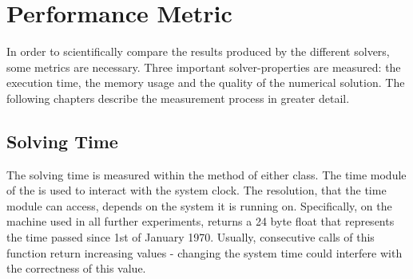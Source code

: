 \documentclass[./\jobname.tex]{subfiles}
\begin{document}
\begin{figure}[H]
	\centering
	\noindent{}
	\label{fig:uml_class_small}
\end{figure}

\section{Performance Metric} 
\label{chap:metric}
In order to scientifically compare the results produced by the different solvers, some metrics are necessary. Three important solver-properties are measured: the execution time, the memory usage and the quality of the numerical solution. The following chapters describe the measurement process in greater detail. 

\subsection{Solving Time}
\label{chap:metric_time}
The solving time is measured within the  method of either class. The time module of the \cite{python_standard_library_time_2020} is used to interact with the system clock. The resolution, that the time module can access, depends on the system it is running on. Specifically, on the machine used in all further experiments,  returns a 24 byte float that represents the time passed since 1st of January 1970. Usually, consecutive calls of this function return increasing values - changing the system time could interfere with the correctness of this value.\\ 
\end{document}
